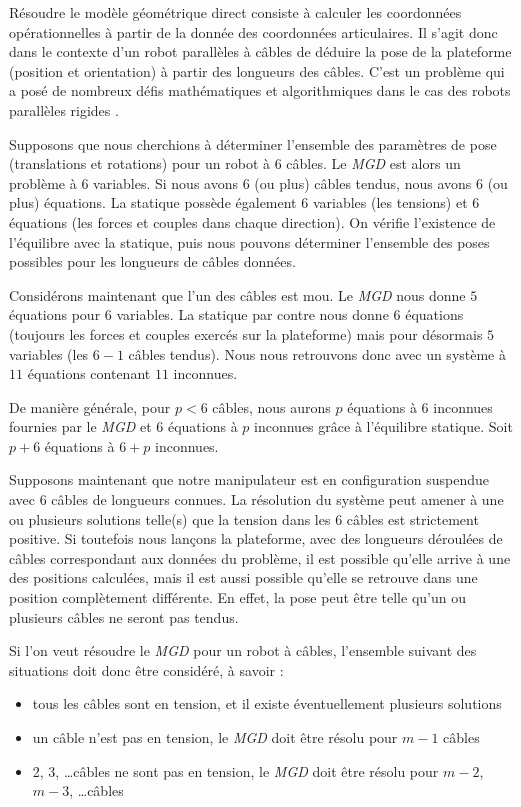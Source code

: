 Résoudre le modèle géométrique direct consiste à calculer les coordonnées opéra\-tionnelles à partir de la donnée des coordonnées articulaires. Il s'agit donc dans le contexte d'un robot parallèles à câbles de déduire la pose de la plateforme (position et orientation) à partir des longueurs des câbles. C'est un problème qui a posé de nombreux défis mathématiques et algorithmiques dans le cas des robots parallèles rigides \cite{merlet1997robots}.

Supposons que nous cherchions à déterminer l'ensemble des paramètres de pose (translations et rotations) pour un robot à $6$ câbles. Le {\it MGD} est alors un problème à $6$ variables. Si nous avons 6 (ou plus) câbles tendus, nous avons $6$ (ou plus) équations. La statique possède également $6$ variables (les tensions) et $6$ équations (les forces et couples dans chaque direction). On vérifie l'existence de l'équilibre avec la statique, puis nous pouvons déterminer l'ensemble des poses possibles pour les longueurs de câbles données.

Considérons maintenant que l'un des câbles est mou. Le {\it MGD} nous donne $5$ équations pour $6$ variables. La statique par contre nous donne $6$ équations (toujours les forces et couples exercés sur la plateforme) mais pour désormais $5$ variables (les $6-1$ câbles tendus). Nous nous retrouvons donc avec un système à $11$ équations contenant $11$ inconnues.

De manière générale, pour $p < 6$ câbles, nous aurons $p$ équations à $6$ inconnues fournies par le {\it MGD} et $6$ équations à $p$ inconnues grâce à l'équilibre statique. Soit $p+6$ équations à $6+p$ inconnues.

Supposons maintenant que notre manipulateur est en configuration suspendue avec $6$ câbles de longueurs connues. La résolution du système peut amener à une ou plusieurs solutions telle(s) que la tension dans les $6$ câbles est strictement positive. Si toutefois nous lançons la plateforme, avec des longueurs déroulées de câbles correspondant aux données du problème, il est possible qu'elle arrive à une des positions calculées, mais il est aussi possible qu'elle se retrouve dans une position complètement différente. En effet, la pose peut être telle qu'un ou plusieurs câbles ne seront pas tendus.

Si l'on veut résoudre le {\it MGD} pour un robot à câbles, l'ensemble suivant des situations doit donc être considéré, à savoir :
\begin{itemize}
 \item tous les câbles sont en tension, et il existe éventuellement plusieurs solutions
 \item un câble n'est pas en tension, le {\it MGD} doit être résolu pour $m-1$ câbles
 \item 2, 3, \dots câbles ne sont pas en tension, le {\it MGD} doit être résolu pour $m-2$, $m-3$, \dots câbles
\end{itemize}

